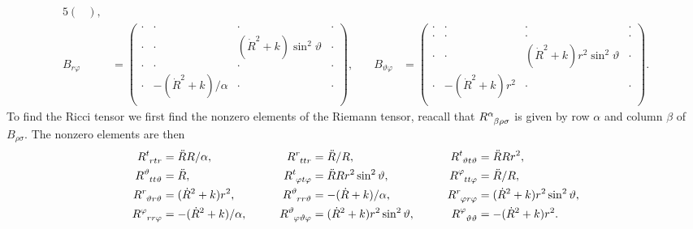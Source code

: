 \documentclass[fleqn]{NotesClass}
\begin{document}
\begin{alignat*}{5}
\begin{pmatrix}
        \end{pmatrix}
        ,\\
        B_{r\varphi} &= 
        \begin{pmatrix}
            \cdot & \cdot & \cdot & \cdot\\
            \cdot & \cdot & (\dot{R}^2 + k)\sin^2\vartheta & \cdot\\
            \cdot & \cdot & \cdot & \cdot\\
            \cdot & -(\dot{R}^2 + k)/\alpha & \cdot & \cdot\\
        \end{pmatrix}
        , \quad & B_{\vartheta\varphi} &= 
        \begin{pmatrix}
            \cdot & \cdot & \cdot & \cdot\\
            \cdot & \cdot & \cdot & \cdot\\
            \cdot & \cdot & (\dot{R}^2 + k)r^2\sin^2\vartheta & \cdot\\
            \cdot & -(\dot{R}^2 + k)r^2 & \cdot & \cdot\\
        \end{pmatrix}
        .
    \end{alignat*}
    \endgroup
    To find the Ricci tensor we first find the nonzero elements of the Riemann tensor, reacall that \(\tensor{R}{^\alpha_{\beta\rho\sigma}}\) is given by row \(\alpha\) and column \(\beta\) of \(B_{\rho\sigma}\).
    The nonzero elements are then
    \begingroup
    \small
    \begin{alignat*}{5}
        \tensor{R}{^t_{rtr}} &= \ddot{R}R/\alpha, \qquad & \tensor{R}{^r_{ttr}} &= \ddot{R}/R, \qquad & \tensor{R}{^t_{\vartheta t \vartheta}} &= \ddot{R}Rr^2,\\
        \tensor{R}{^\vartheta_{tt\vartheta}} &= \ddot{R}, \qquad & \tensor{R}{^t_{\varphi t\varphi}} &= \ddot{R}Rr^2\sin^2\vartheta, \qquad & \tensor{R}{^\varphi_{tt\varphi}} &= \ddot{R}/R,\\
        \tensor{R}{^r_{\vartheta r\vartheta}} &= (\dot{R}^2 + k)r^2, \qquad & \tensor{R}{^\vartheta_{rr\vartheta}} &= -(\dot{R} + k)/\alpha, \qquad & \tensor{R}{^r_{\varphi r \varphi}} &= (\dot{R}^2 + k)r^2\sin^2\vartheta,\\
        \tensor{R}{^\varphi_{rr\varphi}} &= -(\dot{R}^2 + k)/\alpha, \qquad & \tensor{R}{^\vartheta_{\varphi\vartheta\varphi}} &= (\dot{R}^2 + k)r^2\sin^2\vartheta, \qquad & \tensor{R}{^\varphi_{\vartheta\vartheta}} &= -(\dot{R}^2 + k)r^2.
    \end{alignat*}
    \endgroup
    
\end{document}

